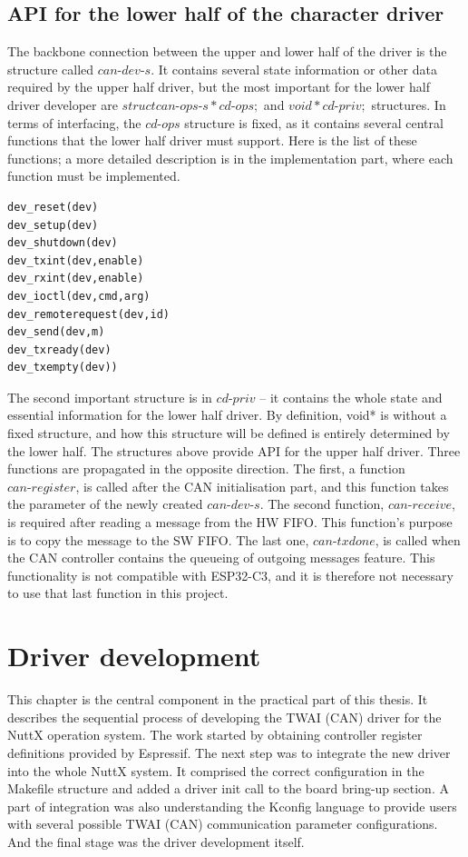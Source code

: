 \documentclass{ctuthesis}
\begin{document}
 \section{API for the lower half of the character driver}
 The backbone connection between the upper and lower half of the driver is the structure called $can\text{-}dev\text{-}s$. It contains several state information or other data required by the upper half driver, but the most important for the lower half driver developer are $struct can\text{-}ops\text{-}s *cd\text{-}ops;$ and $void *cd\text{-}priv;$ structures. In terms of interfacing, the $cd\text{-}ops$ structure is fixed, as it contains several central functions that the lower half driver must support. Here is the list of these functions; a more detailed description is in the implementation part, where each function must be implemented.
\begin{verbatim}
dev_reset(dev)
dev_setup(dev)
dev_shutdown(dev)
dev_txint(dev,enable)
dev_rxint(dev,enable)
dev_ioctl(dev,cmd,arg)
dev_remoterequest(dev,id)
dev_send(dev,m)
dev_txready(dev)
dev_txempty(dev))
\end{verbatim}
The second important structure is in $cd\text{-}priv$ – it contains the whole state and essential information for the lower half driver. By definition, void* is without a fixed structure, and how this structure will be defined is entirely determined by the lower half. The structures above provide API for the upper half driver. Three functions are propagated in the opposite direction. The first, a function $can\text{-}register$, is called after the CAN initialisation part, and this function takes the parameter of the newly created $can\text{-}dev\text{-}s$. The second function, $can\text{-}receive$, is required after reading a message from the HW FIFO. This function's purpose is to copy the message to the SW FIFO. The last one, $can\text{-}txdone$, is called when the CAN controller contains the queueing of outgoing messages feature. This functionality is not compatible with ESP32-C3, and it is therefore not necessary to use that last function in this project.


 \chapter{Driver development}
\label{ch:driver}
  This chapter is the central component in the practical part of this thesis. It describes the sequential process of developing the TWAI (CAN) driver for the NuttX operation system. The work started by obtaining controller register definitions provided by Espressif. The next step was to integrate the new driver into the whole NuttX system. It comprised the correct configuration in the Makefile structure and added a driver init call to the board bring-up section. A part of integration was also understanding the Kconfig language to provide users with several possible TWAI (CAN) communication parameter configurations. And the final stage was the driver development itself.
 
\end{document}
